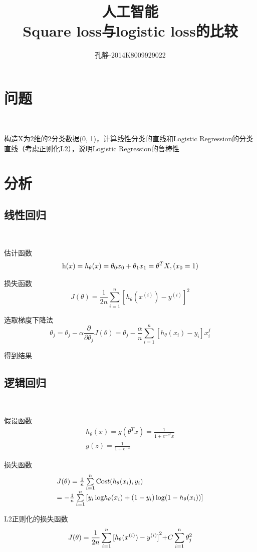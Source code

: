 \documentclass{article}
\title{人工智能\\Square loss与logistic loss的比较}
\author{孔静-2014K8009929022}
\begin{document}
   
	\maketitle
	\tableofcontents
	\newpage
	\section{问题}\
	
		构造X为2维的2分类数据(0, 1)，计算线性分类的直线和Logistic Regression的分类直线（考虑正则化L2），说明Logistic Regression的鲁棒性
	\section{分析}
		\subsection{线性回归}\
			
			估计函数\[{\rm{h}}(x) = {h_\theta }(x) = {\theta _0}{x_0} + {\theta _1}{x_1} = {\theta ^T}X,({x_0} = 1)\]
			
			损失函数\[J(\theta ) = \frac{1}{{2n}}\sum\limits_{i = 1}^n {{{[{h_\theta }({x^{(i)}}) - {y^{(i)}}]}^2}} \]
			
			选取梯度下降法\[{\theta _j} = {\theta _j} - \alpha \frac{\partial }{{\partial {\theta _j}}}J(\theta ) = {\theta _j} - \frac{\alpha }{n}\sum\limits_{i = 1}^n {[{h_\theta }({x_i}) - {y_i}]} x_i^j\]
			
			得到结果
		\subsection{逻辑回归}\
		
			假设函数\[\begin{array}{l}
			{h_\theta }(x) = g({\theta ^T}x) = \frac{1}{{1 + {e^{ - {\theta ^T}}}x}}\\
			g(z) = \frac{1}{{1 + {e^{ - z}}}}
			\end{array}\]
			
			损失函数\[\begin{array}{*{20}{l}}
			{J(\theta ) = \frac{1}{n}\sum\limits_{i = 1}^n {{\rm{Cos}}t({h_\theta }({x_i}),{y_i})} }\\
			{ =  - \frac{1}{n}\sum\limits_{i = 1}^n {[{y_i}\log } {h_\theta }({x_i}) + (1 - {y_i})\log (1 - {h_\theta }({x_i}))]}
			\end{array}\]
			
			L2正则化的损失函数\[J(\theta ) = \frac{1}{{2n}}\sum\limits_{i = 1}^n {{{[{h_\theta }({x^{(i)}}) - {y^{(i)}}]}^2}} {\rm{ + }}C\sum\limits_{i = 1}^n {\theta _j^2} \]
			
\end{document}
